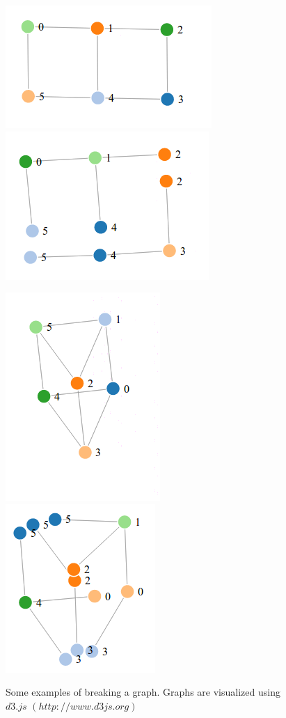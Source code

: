 \documentclass[11pt]{article}
\begin{document}
\begin{figure}
	{\includegraphics[scale=0.7]{./pics/initial.png}}
	{\includegraphics[scale=0.7]{./pics/broken.png}}
	
	{\includegraphics[scale=0.65]{./pics/initial2.png}}
	{\includegraphics[scale=0.65]{./pics/broken2.png}}\
	\caption{\label{brokengraphs} Some examples of breaking a graph. Graphs are visualized using $d3.js$ $(http://www.d3js.org)$ }
\end{figure}
\end{document}
